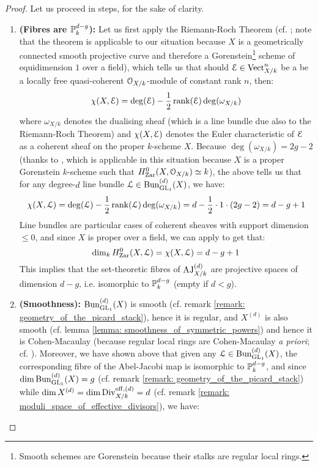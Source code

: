             \begin{proof}
                Let us proceed in steps, for the sake of clarity.
                    \begin{enumerate}
                        \item \textbf{(Fibres are $\P^{d - g}_k$):} Let us first apply the Riemann-Roch Theorem (cf. \cite[\href{https://stacks.math.columbia.edu/tag/0BS6}{Tag 0BS6}]{stacks}; note that the theorem is applicable to our situation because $X$ is a geometrically connected smooth projective curve and therefore a Gorenstein\footnote{Smooth schemes are Gorenstein because their stalks are regular local rings.} scheme of equidimension $1$ over a field), which tells us that should $\E \in \Vect_{X/k}^n$ be a be a locally free quasi-coherent $\calO_{X/k}$-module of constant rank $n$, then:
                            $$\chi(X, \E) = \deg(\E) - \frac12\rank(\E) \deg(\omega_{X/k})$$
                        where $\omega_{X/k}$ denotes the dualising sheaf (which is a line bundle due also to the Riemann-Roch Theorem) and $\chi(X, \E)$ denotes the Euler characteristic of $\E$ as a coherent sheaf on the proper $k$-scheme $X$. Because $\deg(\omega_{X/k}) = 2g - 2$ (thanks to \cite[\href{https://stacks.math.columbia.edu/tag/0C19}{Tag 0C19}]{stacks}, which is applicable in this situation because $X$ is a proper Gorenstein $k$-scheme such that $H^0_{\Zar}(X, \calO_{X/k}) \cong k$), the above tells us that for any degree-$d$ line bundle $\calL \in \Bun_{\GL_1}^{(d)}(X)$, we have:
                            $$\chi(X, \calL) = \deg(\calL) - \frac12 \rank(\calL) \deg(\omega_{X/k}) = d - \frac12 \cdot 1 \cdot (2g - 2) = d - g + 1$$
                        Line bundles are particular cases of coherent sheaves with support dimension $\leq 0$, and since $X$ is proper over a field, we can apply \cite[\href{https://stacks.math.columbia.edu/tag/0AYT}{Tag 0AYT}]{stacks} to get that:
                            $$\dim_k H^0_{\Zar}(X, \calL) = \chi(X, \calL) = d - g + 1$$
                        This implies that the set-theoretic fibres of $\AJ_{X/k}^{(d)}$ are projective spaces of dimension $d - g$, i.e. isomorphic to $\P^{d - g}_k$ (empty if $d < g$).
                        \item \textbf{(Smoothness):} $\Bun_{\GL_1}^{(d)}(X)$ is smooth (cf. remark \ref{remark: geometry_of_the_picard_stack}), hence it is regular, and $X^{(d)}$ is also smooth (cf. lemma \ref{lemma: smoothness_of_symmetric_powers}) and hence it is Cohen-Macaulay (because regular local rings are Cohen-Macaulay \textit{a priori}; cf. \cite[\href{https://stacks.math.columbia.edu/tag/00NQ}{Tag 00NQ}]{stacks}). Moreover, we have shown above that given any $\calL \in \Bun_{\GL_1}^{(d)}(X)$, the corresponding fibre of the Abel-Jacobi map is isomorphic to $\P^{d - g}_k$, and since $\dim \Bun_{\GL_1}^{(d)}(X) = g$ (cf. remark \ref{remark: geometry_of_the_picard_stack}) while $\dim X^{(d)} = \dim \Div_{X/k}^{\eff, (d)} = d$ (cf. remark \ref{remark: moduli_space_of_effective_divisors}), we have:

\end{enumerate}
\end{proof}
